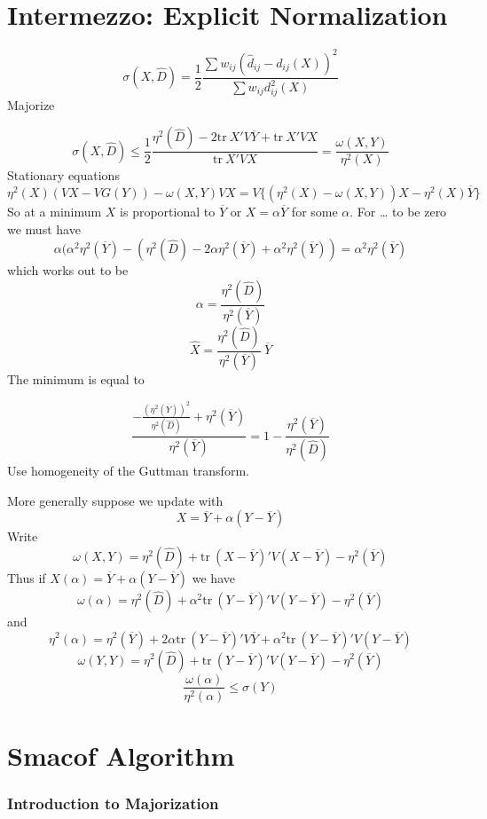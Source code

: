 \documentclass[
  12pt,
  letterpaper,
  DIV=11,
  numbers=noendperiod]{scrartcl}
\begin{document}
\section{Intermezzo: Explicit
Normalization}\label{intermezzo-explicit-normalization}

\[
\sigma(X,\hat D)=\frac12\frac{\sum w_{ij}(\hat d_{ij}-d_{ij}(X))^2}{\sum w_{ij}d_{ij}^2(X)}
\] Majorize

\[
\sigma(X,\hat D)\leq\frac12\frac{\eta^2(\hat D)-2\text{tr}\ X'V\overline{Y}+\text{tr}\ X'VX}{\text{tr}\ X'VX}=\frac{\omega(X,Y)}{\eta^2(X)}
\] Stationary equations \[
\eta^2(X)(VX-VG(Y))-\omega(X,Y)VX=V\{(\eta^2(X)-\omega(X,Y))X-\eta^2(X)\overline Y\}
\] So at a minimum \(X\) is proportional to \(\overline{Y}\) or
\(X=\alpha\overline{Y}\) for some \(\alpha\). For \ldots{} to be zero we
must have \[
\alpha(\alpha^2\eta^2(\overline Y)-(\eta^2(\hat D)-2\alpha\eta^2(\overline Y)+\alpha^2\eta^2(\overline Y))=\alpha^2\eta^2(\overline Y)
\] which works out to be \[
\alpha=\frac{\eta^2(\hat D)}{\eta^2(\overline Y)}
\] \[
\hat X=\frac{\eta^2(\hat D)}{\eta^2(\overline Y)}\ \overline{Y}
\] The minimum is equal to

\[
\frac{-\frac{(\eta^2(\overline Y))^2}{\eta^2(\hat D)}+\eta^2(\overline Y)}{\eta^2(\overline Y)}=1-\frac{\eta^2(\overline Y)}{\eta^2(\hat D)}
\] Use homogeneity of the Guttman transform.

More generally suppose we update with \[
X=\overline Y+\alpha(Y-\overline Y)
\] Write \[
\omega(X,Y)=\eta^2(\hat D)+\text{tr}\ (X-\overline Y)'V(X-\overline Y)-\eta^2(\overline Y)
\] Thus if \(X(\alpha)=\overline Y+\alpha(Y-\overline Y)\) we have \[
\omega(\alpha)=\eta^2(\hat D)+\alpha^2\text{tr}\ (Y-\overline Y)'V(Y-\overline Y)-\eta^2(\overline Y)
\] and \[
\eta^2(\alpha)=\eta^2(\overline Y)+2\alpha\text{tr}\ (Y-\overline Y)'V\overline Y+\alpha^2\text{tr}\ (Y-\overline Y)'V(Y-\overline Y)
\] \[
\omega(Y,Y)=\eta^2(\hat D)+\text{tr}\ (Y-\overline Y)'V(Y-\overline Y)-\eta^2(\overline Y)
\] \[
\frac{\omega(\alpha)}{\eta^2(\alpha)}\leq\sigma(Y)
\]

\section{Smacof Algorithm}\label{smacof-algorithm}

\subsubsection{Introduction to
Majorization}\label{introduction-to-majorization}
\end{document}
